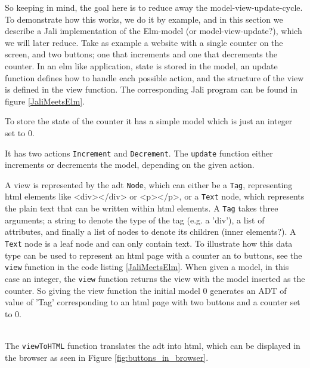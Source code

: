 
So keeping in mind, the goal here is to reduce away the model-view-update-cycle. To demonstrate how this works, we do it by example, and in this section we describe a Jali implementation of the Elm-model (or model-view-update?), which we will later reduce. Take as example a website with a single counter on the screen, and two buttons; one that increments and one that decrements the counter. In an elm like application, state is stored in the model, an update function defines how to handle each possible action, and the structure of the view is defined in the view function. The corresponding Jali program can be found in figure \ref{JaliMeetsElm}. 



To store the state of the counter it has a simple model which is just an integer set to 0. 

It has two actions \texttt{Increment} and \texttt{Decrement}. The \texttt{update} function either increments or decrements the model, depending on the given action. 

A view is represented by the \gls{adt} \texttt{Node}, which can either be a \texttt{Tag}, representing \gls{html} elements like <div></div> or <p></p>, or a \texttt{Text} node, which represents the plain text that can be written within \gls{html} elements. A \texttt{Tag} takes three arguments; a string to denote the type of the tag (e.g. a 'div'), a list of attributes, and finally a list of nodes to denote its children (inner elements?). A \texttt{Text} node is a leaf node and can only contain text. To illustrate how this data type can be used to represent an \gls{html} page with a counter an to buttons, see the \texttt{view} function in the code listing \ref{JaliMeetsElm}. When given a model, in this case an integer, the  \texttt{view} function returns the view with the model inserted as the counter. So giving the view function the initial model 0 generates an ADT of value of 'Tag' corresponding to an \gls{html} page with two buttons and a counter set to 0.


% 
\\
The \texttt{viewToHTML} function translates the \gls{adt} into \gls{html}, which can be displayed in the browser as seen in Figure \ref{fig:buttons_in_browser}. 

